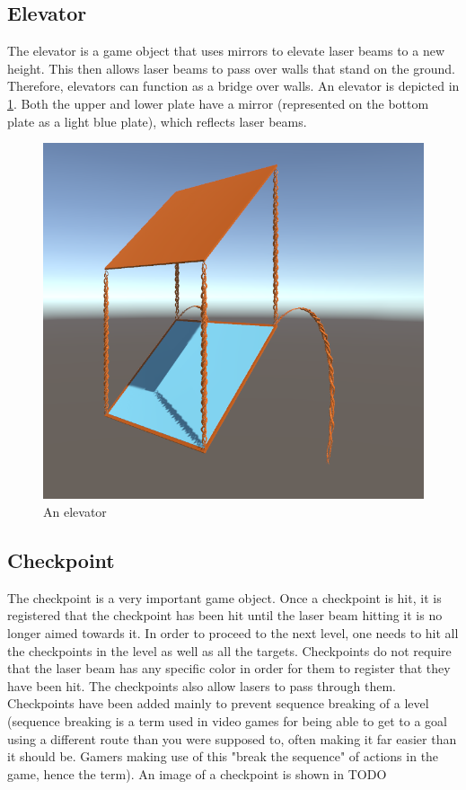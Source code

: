 		\subsection{Elevator} \label{ssec:elevator}
			The elevator is a game object that uses mirrors to elevate laser beams
			to a new height. This then allows laser beams to pass over walls that 
			stand on the ground. Therefore, elevators can function as a bridge over
			walls. An elevator is depicted in \ref{fig:elevator}. Both the upper and 
			lower plate have a mirror (represented on the bottom plate as a light 
			blue plate), which reflects laser beams.
			\begin{figure}[!ht]
				\centering
				\includegraphics[scale = 0.3]{Elevator}
				\caption{An elevator}
				\label{fig:elevator}
			\end{figure}
			
		\subsection{Checkpoint}
			The checkpoint is a very important game object. Once a checkpoint is
			hit, it is registered that the checkpoint has been hit until the
			laser beam hitting it is no longer aimed towards it. In order to
			proceed to the next level, one needs to hit all the checkpoints
			in the level as well as all the targets. Checkpoints do not require
			that the laser beam has any specific color in order for them to register
			that they have been hit. The checkpoints also allow lasers to pass
			through them. Checkpoints have been added mainly to prevent sequence
			breaking of a level (sequence breaking is a term used in video games
			for being able to get to a goal using a different route than you were
			supposed to, often making it far easier than it should be. Gamers making
			use of this "break the sequence" of actions in the game, hence the term).
			An image of a checkpoint is shown in TODO
			
